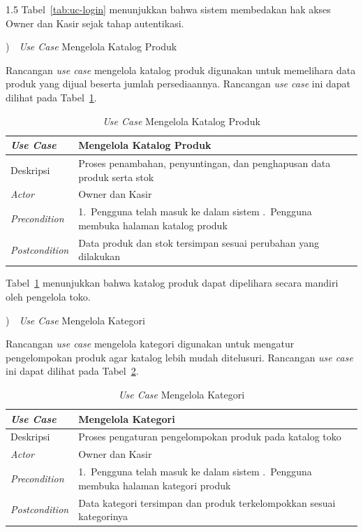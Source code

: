 \documentclass[12pt, a4paper, onecolumn, oneside]{report}
\begin{document}
\begin{spacing}{1.5}
Tabel~\ref{tab:uc-login} menunjukkan bahwa sistem membedakan hak akses Owner dan Kasir sejak tahap autentikasi.

)~~\textit{Use Case} Mengelola Katalog Produk

Rancangan \textit{use case} mengelola katalog produk digunakan untuk memelihara data produk yang dijual beserta jumlah persediaannya. Rancangan \textit{use case} ini dapat dilihat pada Tabel~\ref{tab:uc-produk}.

\begin{table}[H]
\centering
\caption{\textit{Use Case} Mengelola Katalog Produk}
\label{tab:uc-produk}
\begin{tabularx}{\textwidth}{|p{3.2cm}|X|}
\hline
\textbf{\textit{Use Case}} & \textbf{Mengelola Katalog Produk} \\ \hline
Deskripsi & Proses penambahan, penyuntingan, dan penghapusan data produk serta stok \\ \hline
\textit{Actor} & Owner dan Kasir \\ \hline
\textit{Precondition} & 1.~Pengguna telah masuk ke dalam sistem \newline 2.~Pengguna membuka halaman katalog produk \\ \hline
\textit{Postcondition} & Data produk dan stok tersimpan sesuai perubahan yang dilakukan \\ \hline
\end{tabularx}
\end{table}

Tabel~\ref{tab:uc-produk} menunjukkan bahwa katalog produk dapat dipelihara secara mandiri oleh pengelola toko.

)~~\textit{Use Case} Mengelola Kategori

Rancangan \textit{use case} mengelola kategori digunakan untuk mengatur pengelompokan produk agar katalog lebih mudah ditelusuri. Rancangan \textit{use case} ini dapat dilihat pada Tabel~\ref{tab:uc-kategori}.

\begin{table}[H]
\centering
\caption{\textit{Use Case} Mengelola Kategori}
\label{tab:uc-kategori}
\begin{tabularx}{\textwidth}{|p{3.2cm}|X|}
\hline
\textbf{\textit{Use Case}} & \textbf{Mengelola Kategori} \\ \hline
Deskripsi & Proses pengaturan pengelompokan produk pada katalog toko \\ \hline
\textit{Actor} & Owner dan Kasir \\ \hline
\textit{Precondition} & 1.~Pengguna telah masuk ke dalam sistem \newline 2.~Pengguna membuka halaman kategori produk \\ \hline
\textit{Postcondition} & Data kategori tersimpan dan produk terkelompokkan sesuai kategorinya \\ \hline
\end{tabularx}
\end{table}


\end{spacing}
\end{document}
